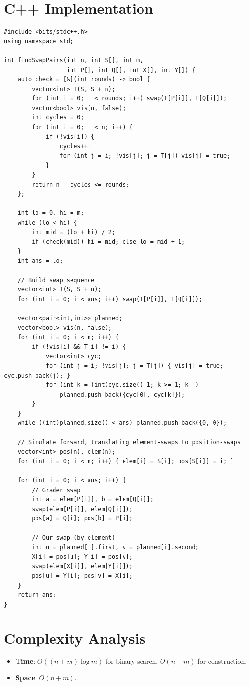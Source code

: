 \documentclass[11pt,a4paper]{article}
\begin{document}
\section{C++ Implementation}

\begin{lstlisting}
#include <bits/stdc++.h>
using namespace std;

int findSwapPairs(int n, int S[], int m,
                  int P[], int Q[], int X[], int Y[]) {
    auto check = [&](int rounds) -> bool {
        vector<int> T(S, S + n);
        for (int i = 0; i < rounds; i++) swap(T[P[i]], T[Q[i]]);
        vector<bool> vis(n, false);
        int cycles = 0;
        for (int i = 0; i < n; i++) {
            if (!vis[i]) {
                cycles++;
                for (int j = i; !vis[j]; j = T[j]) vis[j] = true;
            }
        }
        return n - cycles <= rounds;
    };

    int lo = 0, hi = m;
    while (lo < hi) {
        int mid = (lo + hi) / 2;
        if (check(mid)) hi = mid; else lo = mid + 1;
    }
    int ans = lo;

    // Build swap sequence
    vector<int> T(S, S + n);
    for (int i = 0; i < ans; i++) swap(T[P[i]], T[Q[i]]);

    vector<pair<int,int>> planned;
    vector<bool> vis(n, false);
    for (int i = 0; i < n; i++) {
        if (!vis[i] && T[i] != i) {
            vector<int> cyc;
            for (int j = i; !vis[j]; j = T[j]) { vis[j] = true; cyc.push_back(j); }
            for (int k = (int)cyc.size()-1; k >= 1; k--)
                planned.push_back({cyc[0], cyc[k]});
        }
    }
    while ((int)planned.size() < ans) planned.push_back({0, 0});

    // Simulate forward, translating element-swaps to position-swaps
    vector<int> pos(n), elem(n);
    for (int i = 0; i < n; i++) { elem[i] = S[i]; pos[S[i]] = i; }

    for (int i = 0; i < ans; i++) {
        // Grader swap
        int a = elem[P[i]], b = elem[Q[i]];
        swap(elem[P[i]], elem[Q[i]]);
        pos[a] = Q[i]; pos[b] = P[i];

        // Our swap (by element)
        int u = planned[i].first, v = planned[i].second;
        X[i] = pos[u]; Y[i] = pos[v];
        swap(elem[X[i]], elem[Y[i]]);
        pos[u] = Y[i]; pos[v] = X[i];
    }
    return ans;
}
\end{lstlisting}

\section{Complexity Analysis}

\begin{itemize}
  \item \textbf{Time}: $O((n + m) \log m)$ for binary search, $O(n + m)$ for construction.
  \item \textbf{Space}: $O(n + m)$.
\end{itemize}
\end{document}
